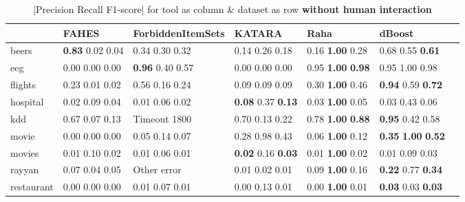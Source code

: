 \begin{table}[h]
\centering
\caption{|Precision Recall F1-score| for tool as column \& dataset as row \textbf{without human interaction}}
\begin{adjustbox}{center}
\begin{tabular}{lllllll}
\toprule
{} &                               FAHES &           ForbiddenItemSets &                              KATARA &                                Raha &                                      dBoost \\
\midrule
beers       &          \textbf{0.83} 0.02  0.04   &          0.34  0.30  0.32   &                  0.14  0.26  0.18   &          0.16  \textbf{1.00} 0.28   &                  0.68  0.55  \textbf{0.61}  \\
eeg         &                  0.00  0.00  0.00   &  \textbf{0.96} 0.40  0.57   &                  0.00  0.00  0.00   &  0.95  \textbf{1.00} \textbf{0.98}  &                          0.95  1.00  0.98   \\
flights     &                  0.23  0.01  0.02   &          0.56  0.16  0.24   &                  0.09  0.09  0.09   &          0.30  \textbf{1.00} 0.46   &          \textbf{0.94} 0.59  \textbf{0.72}  \\
hospital    &                  0.02  0.09  0.04   &          0.01  0.06  0.02   &  \textbf{0.08} 0.37  \textbf{0.13}  &          0.03  \textbf{1.00} 0.05   &                          0.03  0.43  0.06   \\
kdd         &                  0.67  0.07  0.13   &                Timeout 1800 &                  0.70  0.13  0.22   &  0.78  \textbf{1.00} \textbf{0.88}  &                  \textbf{0.95} 0.42  0.58   \\
movie       &                  0.00  0.00  0.00   &          0.05  0.14  0.07   &                  0.28  0.98  0.43   &          0.06  \textbf{1.00} 0.12   &  \textbf{0.35} \textbf{1.00} \textbf{0.52}  \\
movies      &                  0.01  0.10  0.02   &          0.01  0.06  0.01   &  \textbf{0.02} 0.16  \textbf{0.03}  &          0.01  \textbf{1.00} 0.02   &                          0.01  0.09  0.03   \\
rayyan      &                  0.07  0.04  0.05   &                 Other error &                  0.01  0.02  0.01   &          0.09  \textbf{1.00} 0.16   &          \textbf{0.22} 0.77  \textbf{0.34}  \\
restaurant  &                  0.00  0.00  0.00   &          0.01  0.07  0.01   &                  0.00  0.13  0.01   &          0.00  \textbf{1.00} 0.01   &          \textbf{0.03} 0.03  \textbf{0.03}  \\

\end{tabular}
\end{adjustbox}
\end{table}
